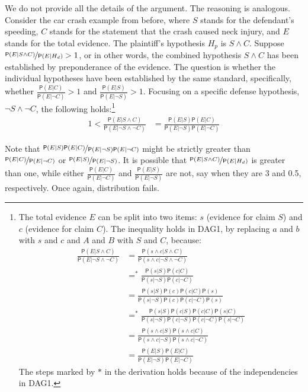 \documentclass[
  10pt,
  dvipsnames,enabledeprecatedfontcommands]{scrartcl}
\newcommand{\n}{\neg}
\newcommand{\et}{\wedge}
\newcommand{\pr}[1]{\ensuremath{\mathsf{P}(#1)}}
\begin{document}
We do not provide all the details of the argument. The reasoning is
analogous. Consider the car crash example from before, where \(S\)
stands for the defendant's speeding, \(C\) stands for the statement that
the crash caused neck injury, and \(E\) stands for the total evidence.
The plaintiff's hypothesis \(H_p\) is \(S\et C\). Suppose
\(\nicefrac{\pr{E \vert S\et C}}{\pr{E \vert H_d}}>1\), or in other
words, the combined hypothesis \(S \et C\) has been established by
preponderance of the evidence. The question is whether the individual
hypotheses have been established by the same standard, specifically,
whether \(\frac{\pr{E \vert C}}{\pr{E\vert \neg C}} > 1\) and
\(\frac{\pr{E \vert S}}{\pr{E\vert \neg S}} > 1\). Focusing on a
specific defense hypothesis, \(\n S\et \n C\), the following
holds:\footnote{The total evidence \(E\) can be split into two items:
  \(s\) (evidence for claim \(S\)) and \(c\) (evidence for claim \(C\)).
  The inequality holds in \textsf{DAG1}, by replacing \(a\) and \(b\)
  with \(s\) and \(c\) and \(A\) and \(B\) with \(S\) and \(C\),
  because: \begin{align*}
   \frac{\pr{E \vert S\et C}}{\pr{E\vert \n S\et \n C}} & = \frac{\pr{s \et c \vert S\et C}}{\pr{ s \et c \vert \n S\et \n C}} \\
  & =^*  \frac{\pr{s \vert S}\pr{c \vert C}}{\pr{ s \vert \n S} \pr{c \vert  \n C}} \\
  & =  \frac{\pr{s \vert S}\pr{c}\pr{c \vert C}\pr{s}}{\pr{ s \vert \n S}\pr{c} \pr{c \vert  \n C}\pr{s}} \\
  & =^*  \frac{\pr{s \vert S}\pr{c \vert S}\pr{c \vert C}\pr{s\vert C}}{\pr{ s \vert \n S}\pr{c\vert \n S} \pr{c \vert  \n C}\pr{s\vert \n C}} \\
  & =  \frac{\pr{s \et c \vert S}\pr{ s\et c \vert C}}{\pr{ s \et c \vert \n S} \pr{s\et c \vert  \n C}} \\
  & =  \frac{\pr{E \vert S}\pr{E \vert C}}{\pr{E \vert \n S} \pr{E \vert  \n C}}
  \end{align*} The steps marked by \(*\) in the derivation holds because
  of the independencies in \textsf{DAG1}.}
\begin{align}\label{eq:lr-multiplication-two}
1 < \frac{\pr{E \vert S\et C}}{\pr{E\vert \n S\et \n C}} & = \frac{\pr{E\vert S}\pr{E\vert C}}{\pr{ E \vert \n S}\pr{E \vert \n C}}   
\end{align}

\noindent Note that
\(\nicefrac{\pr{E\vert S}\pr{E\vert C}}{\pr{E \vert \n S}\pr{E\vert \n C}}\)
might be strictly greater than
\(\nicefrac{\pr{E\vert C}}{\pr{E\vert \n C}}\) or
\(\nicefrac{\pr{E\vert S}}{\pr{E\vert \n S}}\). It is possible that
\(\nicefrac{\pr{E \vert S\et C}}{\pr{E \vert H_d}}\) is greater than
one, while either \(\frac{\pr{E \vert C}}{\pr{E\vert \neg C}}\) and
\(\frac{\pr{E \vert S}}{\pr{E\vert \neg S}}\) are not, say when they are
3 and 0.5, respectively. Once again, distribution fails.
\end{document}
